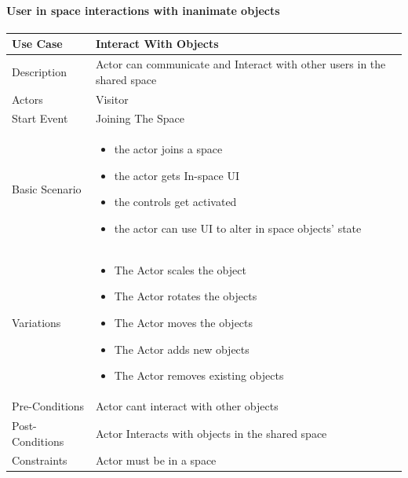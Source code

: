   \paragraph{User in space interactions with inanimate objects}
 
  \begin{center}
    \begin{tabular}{ | p{3cm} | p{12cm} |}
    \hline
    \hline
    \hline
        \hline
        Use Case        & Interact With Objects \\
        \hline
        Description     & Actor can communicate and Interact with other users in the shared space\\
        \hline
        Actors          & Visitor\\
        \hline
        Start Event     & Joining The Space\\
        \hline
        Basic Scenario  & \begin{itemize}[noitemsep, nosep] \setlength\itemsep{1pt} \item the actor joins a space \item the actor gets In-space UI \item the controls get activated \item the actor can use UI to alter in space objects' state \end{itemize}\\
        \hline
        Variations      & \begin{itemize}[noitemsep, nosep] \setlength\itemsep{1pt} \item The Actor scales the object \item The Actor rotates the objects \item The Actor moves the objects \item The Actor adds new objects \item The Actor removes existing objects \end{itemize}\\
        \hline
        Pre-Conditions  & Actor cant interact with other objects\\
        \hline
        Post-Conditions & Actor Interacts with objects in the shared space\\
        \hline
        Constraints     & Actor must be in a space\\
        \hline
    \hline
    \end{tabular}
  \end{center}
  \pagebreak
  
